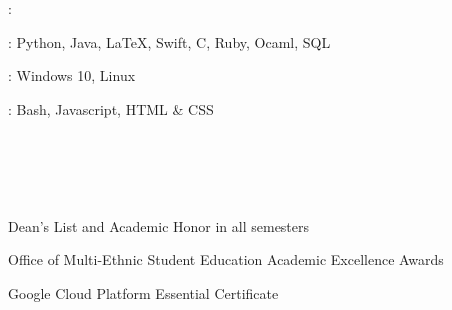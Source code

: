 \documentclass{resume}
\newif\ifen
\newif\ifzh
\newif\ifboth
\newcommand{\en}[1]{\ifen#1\fi}
\newcommand{\zh}[1]{\ifzh#1\fi}
\newcommand{\both}[1]{\ifboth#1\fi}
\begin{document}
    \section{\faCogs\ \en{Skills}\both{ }\zh{技能}}
    \begin{myitemize}
        \item \en{Languages}\both{ }\zh{语言}: \en{English - Proficient, Chinese - Native}
        \item \en{Programming Languages}\both{ }\zh{编程语言}: Python, Java, \LaTeX, Swift, C, Ruby, Ocaml, SQL
        \item \en{Platform}\both{ }\zh{平台}: Windows 10, Linux
        \item \en{Others}\both{ }\zh{其他}: Bash, Javascript, HTML \& CSS
        \item \en{Class B Commercial Drivers' License}
    \end{myitemize}

    \section{\faCertificate\ \en{Honors \& Certificates}\both{ }\zh{荣誉与证书}}
    \begin{myitemize}
        \item Dean's List and Academic Honor in all semesters
        \item Office of Multi-Ethnic Student Education Academic Excellence Awards
        \item Google Cloud Platform Essential Certificate
    \end{myitemize}
\end{document}
